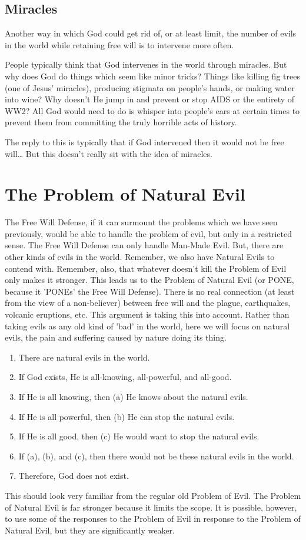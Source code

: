 \subsection{Miracles}

Another way in which God could get rid of, or at least limit, the number of evils in the world while retaining free will is to intervene more often.

People typically think that God intervenes in the world through miracles. But why does God do things which seem like minor tricks? Things like killing fig trees (one of Jesus’ miracles), producing stigmata on people’s hands, or making water into wine? Why doesn’t He jump in and prevent or stop AIDS or the entirety of WW2? All God would need to do is whisper into people's ears at certain times to prevent them from committing the truly horrible acts of history.

The reply to this is typically that if God intervened then it would not be free will… But this doesn’t really sit with the idea of miracles.

\section{The Problem of Natural Evil}
The Free Will Defense, if it can surmount the problems which we have seen previously, would be able to handle the problem of evil, but only in a restricted sense. The Free Will Defense can only handle Man-Made Evil. But, there are other kinds of evils in the world. Remember, we also have Natural Evils to contend with. Remember, also, that whatever doesn't kill the Problem of Evil only makes it stronger. This leads us to the Problem of Natural Evil (or PONE, because it 'PONEs' the Free Will Defense). There is no real connection (at least from the view of a non-believer) between free will and the plague, earthquakes, volcanic eruptions, etc. This argument is taking this into account. Rather than taking evils as any old kind of 'bad' in the world, here we will focus on natural evils, the pain and suffering caused by nature doing its thing. 
\begin{enumerate}
    \item There are natural evils in the world.
    \item If God exists, He is all-knowing, all-powerful, and all-good.
    \item If He is all knowing, then (a) He knows about the natural evils.
    \item If He is all powerful, then (b) He can stop the natural evils.
    \item If He is all good, then (c) He would want to stop the natural evils.
    \item If (a), (b), and (c), then there would not be these natural evils in the world.
    \item Therefore, God does not exist.
\end{enumerate}
This should look very familiar from the regular old Problem of Evil. The Problem of Natural Evil is far stronger because it limits the scope. It is possible, however, to use some of the responses to the Problem of Evil in response to the Problem of Natural Evil, but they are significantly weaker. 

